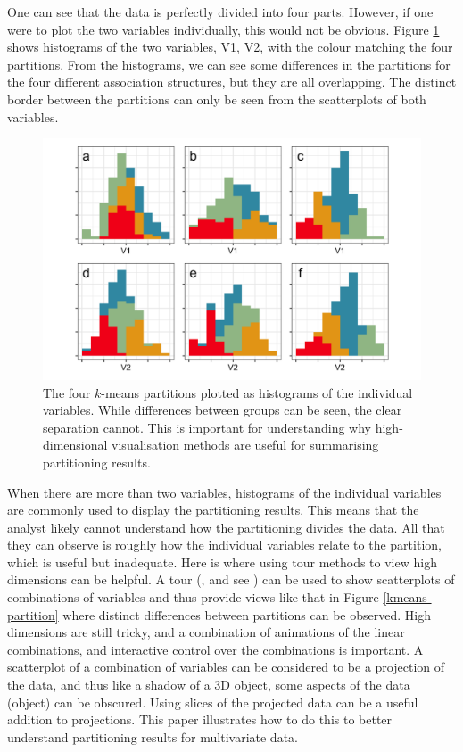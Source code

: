 \documentclass[article]{ajs}
\begin{document}
One can see that the data is perfectly divided into four parts. However, if one were to plot the two variables individually, this would not be obvious. Figure \ref{kmeans-histogram} shows histograms of the two variables, V1, V2, with the colour matching the four partitions. From the histograms, we can see some differences in the partitions for the four different association structures, but they are all overlapping. The distinct border between the partitions can only be seen from the scatterplots of both variables. 

\begin{figure}[ht]
\centerline{\includegraphics[width=1\textwidth]{images/intro2.png}}
\caption{The four $k$-means partitions plotted as histograms of the individual variables. While differences between groups can be seen, the clear separation cannot. This is important for understanding why high-dimensional visualisation methods are useful for summarising partitioning results.}
\label{kmeans-histogram}
\end{figure}

When there are more than two variables, histograms of the individual variables are commonly used to display the partitioning results. This means that the analyst likely cannot understand how the partitioning divides the data. All that they can observe is roughly how the individual variables relate to the partition, which is useful but inadequate. Here is where using tour methods to view high dimensions can be helpful. A tour (\cite{Asimov1985-xr}, and see \cite{lee2022}) can be used to show scatterplots of combinations of variables and thus provide views like that in Figure \ref{kmeans-partition} where distinct differences between partitions can be observed. High dimensions are still tricky, and a combination of animations of the linear combinations, and interactive control \citep{cook_manual_1997, laa2023new} over the combinations is important. A scatterplot of a combination of variables can be considered to be a projection of the data, and thus like a shadow of a 3D object, some aspects of the data (object) can be obscured. Using slices of the projected data \citep{Laa2020} can be a useful addition to projections. This paper illustrates how to do this to better understand partitioning results for multivariate data.
\end{document}
